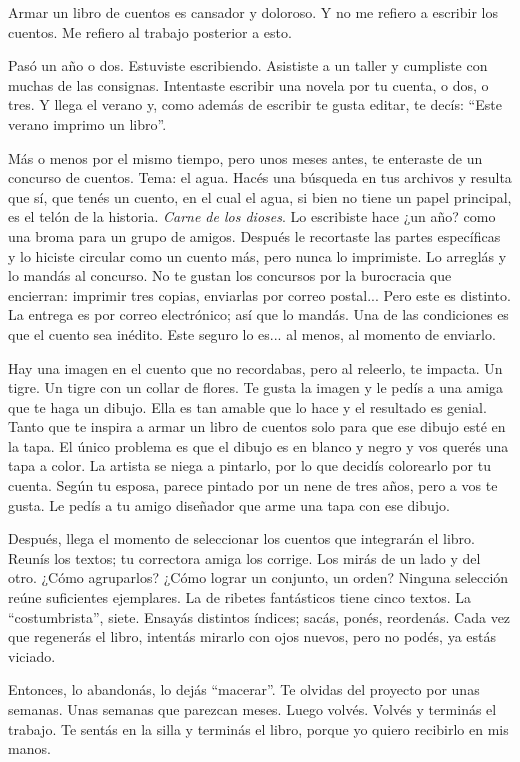 \documentclass[11pt,twoside,openright]{book}
\begin{document}
\begin{em}
Armar un libro de cuentos es cansador y doloroso. Y no me refiero a escribir los cuentos. Me refiero al trabajo posterior a esto.

Pasó un año o dos. Estuviste escribiendo. Asististe a un taller y cumpliste con muchas de las consignas. Intentaste escribir una novela por tu cuenta, o dos, o tres. Y llega el verano y, como además de escribir te gusta editar, te decís: “Este verano imprimo un libro”.

Más o menos por el mismo tiempo, pero unos meses antes, te enteraste de un concurso de cuentos. Tema: el agua. Hacés una búsqueda en tus archivos y resulta que sí, que tenés un cuento, en el cual el agua, si bien no tiene un papel principal, es el telón de la historia. \emph{Carne de los dioses}. Lo escribiste hace ¿un año? como una broma para un grupo de amigos. Después le recortaste las partes específicas y lo hiciste circular como un cuento más, pero nunca lo imprimiste. Lo arreglás y lo mandás al concurso. No te gustan los concursos por la burocracia que encierran: imprimir tres copias, enviarlas por correo postal... Pero este es distinto. La entrega es por correo electrónico; así que lo mandás. Una de las condiciones es que el cuento sea inédito. Este seguro lo es... al menos, al momento de enviarlo.

Hay una imagen en el cuento que no recordabas, pero al releerlo, te impacta. Un tigre. Un tigre con un collar de flores. Te gusta la imagen y le pedís a una amiga que te haga un dibujo. Ella es tan amable que lo hace y el resultado es genial. Tanto que te inspira a armar un libro de cuentos solo para que ese dibujo esté en la tapa. El único problema es que el dibujo es en blanco y negro y vos querés una tapa a color. La artista se niega a pintarlo, por lo que decidís colorearlo por tu cuenta. Según tu esposa, parece pintado por un nene de tres años, pero a vos te gusta. Le pedís a tu amigo diseñador que arme una tapa con ese dibujo.

Después, llega  el momento de seleccionar los cuentos que integrarán el libro. Reunís los textos; tu correctora amiga los corrige. Los mirás de un lado y del otro. ¿Cómo agruparlos? ¿Cómo lograr un conjunto, un orden? Ninguna selección reúne suficientes ejemplares. La de ribetes fantásticos tiene cinco textos. La “costumbrista”, siete. Ensayás distintos índices; sacás, ponés, reordenás. Cada vez que regenerás el libro, intentás mirarlo con ojos nuevos, pero no podés, ya estás viciado.

Entonces, lo abandonás, lo dejás “macerar”. Te olvidas del proyecto por unas semanas. Unas semanas que parezcan meses. Luego volvés. Volvés y terminás el trabajo. Te sentás en la silla y terminás el libro, porque yo quiero recibirlo en mis manos.

\end{em}
\end{document}

